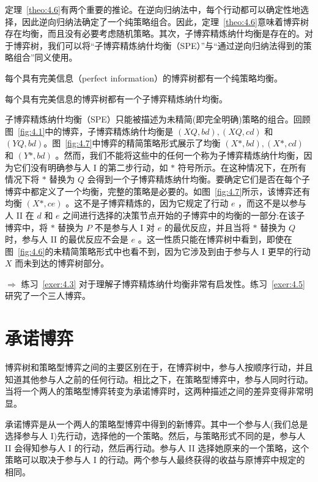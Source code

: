 定理~\ref{theo:4.6}有两个重要的推论。在逆向归纳法中，每个行动都可以确定性地选择，因此逆向归纳法确定了一个纯策略组合。因此，定理~\ref{theo:4.6}意味着博弈树存在均衡，而且没有必要考虑随机策略。其次，子博弈精炼纳什均衡是存在的。对于博弈树，我们可以将“子博弈精炼纳什均衡（SPE）”与“通过逆向归纳法得到的策略组合”同义使用。

\begin{corollary}\label{cor:4.7}
每个具有完美信息（perfect information）的博弈树都有一个纯策略均衡。
\end{corollary}

\begin{corollary}\label{cor:4.8}
每个具有完美信息的博弈树都有一个子博弈精炼纳什均衡。
\end{corollary}

子博弈精炼纳什均衡（SPE）只能被描述为未精简(即完全明确)策略的组合。回顾图~\ref{fig:4.1}中的博弈，子博弈精炼纳什均衡是 \(\left( {{XQ},{bd}}\right) ,\left( {{XQ},{cd}}\right)\) 和 \((YQ,bd)\)。图~\ref{fig:4.7}中博弈的精简策略形式展示了均衡 \(\left( {X*,{bd}}\right) ,\left( {X*,{cd}}\right)\) 和 \(\left( {Y*,{bd}}\right)\) 。然而，我们不能将这些中的任何一个称为子博弈精炼纳什均衡，因为它们没有明确参与人 I 的第二步行动，如 \(*\) 符号所示。在这种情况下，在所有情况下将 \(*\) 替换为 \(Q\) 会得到一个子博弈精炼纳什均衡。要确定它们是否在每个子博弈中都定义了一个均衡，完整的策略是必要的。如图~\ref{fig:4.7}所示，该博弈还有均衡 \(\left( {X*,{ce}}\right)\) 。这不是子博弈精炼的，因为它规定了行动 \(e\) ，而这不是以参与人 II 在 \(d\) 和 \(e\) 之间进行选择的决策节点开始的子博弈中的均衡的一部分:在该子博弈中，将 \(*\) 替换为 \(P\) 不是参与人 I 对 \(e\) 的最优反应，并且当将 \(*\) 替换为 \(Q\) 时，参与人 II 的最优反应不会是 \(e\) 。这一性质只能在博弈树中看到，即使在图~\ref{fig:4.6}的未精简策略形式中也看不到，因为它涉及到由于参与人 \(\mathrm{I}\) 更早的行动 \(X\) 而未到达的博弈树部分。

\(\Rightarrow\) 练习~\ref{exer:4.3} 对于理解子博弈精炼纳什均衡非常有启发性。练习~\ref{exer:4.5} 研究了一个三人博弈。

\section{承诺博弈}\label{sec-4.7}

博弈树和策略型博弈之间的主要区别在于，在博弈树中，参与人按顺序行动，并且知道其他参与人之前的任何行动。相比之下，在策略型博弈中，参与人同时行动。当将一个两人的策略型博弈转变为承诺博弈时，这两种描述之间的差异变得非常明显。

承诺博弈是从一个两人的策略型博弈中得到的新博弈。其中一个参与人(我们总是选择参与人 I)先行动，选择他的一个策略。然后，与策略形式不同的是，参与人 II 会得知参与人 I 的行动，然后再行动。参与人 II 选择她原来的一个策略，这个策略可以取决于参与人 I 的行动。两个参与人最终获得的收益与原博弈中规定的相同。

